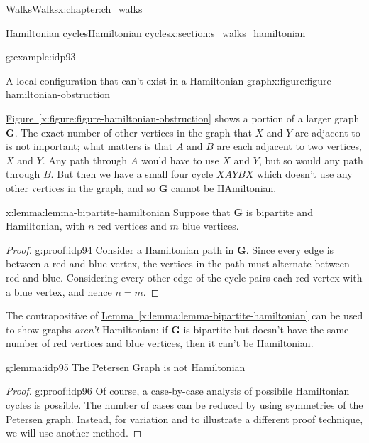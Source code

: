 \documentclass[oneside,10pt,]{book}
\newcommand{\xreffont}{\relax}
\numberwithin{equation}{section}
\newcommand{\bfG}{\mathbf{G}}
\begin{document}
\begin{chapterptx}{Walks}{}{Walks}{}{}{x:chapter:ch_walks}
\begin{sectionptx}{Hamiltonian cycles}{}{Hamiltonian cycles}{}{}{x:section:s_walks_hamiltonian}
\begin{example}{}{g:example:idp93}
\begin{figureptx}{A local configuration that can't exist in a Hamiltonian graph}{x:figure:figure-hamiltonian-obstruction}{}
\begin{image}{0.15}{0.7}{0.15}
{
}%
\end{image}%
\tcblower
\end{figureptx}%
\hyperref[x:figure:figure-hamiltonian-obstruction]{Figure~{\xreffont\ref{x:figure:figure-hamiltonian-obstruction}}} shows a portion of a larger graph \(\bfG\).  The exact number of other vertices in the graph that \(X\) and \(Y\) are adjacent to is not important; what matters is that \(A\) and \(B\) are each adjacent to two vertices, \(X\) and \(Y\).  Any path through \(A\) would have to use \(X\) and \(Y\), but so would any path through \(B\).  But then we have a small four cycle \(XAYBX\) which doesn't use any other vertices in the graph, and so \(\bfG\) cannot be HAmiltonian.%
\end{example}
\begin{lemma}{}{}{x:lemma:lemma-bipartite-hamiltonian}%
Suppose that \(\bfG\) is bipartite and Hamiltonian, with \(n\) red vertices and \(m\) blue vertices.%
\end{lemma}
\begin{proof}{}{g:proof:idp94}
Consider a Hamiltonian path in \(\bfG\).  Since every edge is between a red and blue vertex, the vertices in the path must alternate between red and blue.  Considering every other edge of the cycle pairs each red vertex with a blue vertex, and hence \(n=m\).%
\end{proof}
The contrapositive of \hyperref[x:lemma:lemma-bipartite-hamiltonian]{Lemma~{\xreffont\ref{x:lemma:lemma-bipartite-hamiltonian}}} can be used to show graphs \emph{aren't} Hamiltonian: if \(\bfG\) is bipartite but doesn't have the same number of red vertices and blue vertices, then it can't be Hamiltonian.%
\begin{lemma}{}{}{g:lemma:idp95}%
The Petersen Graph is not Hamiltonian%
\end{lemma}
\begin{proof}{}{g:proof:idp96}
Of course, a case-by-case analysis of possibile Hamiltonian cycles is possible.  The number of cases can be reduced by using symmetries of the Petersen graph. Instead, for variation and to illustrate a different proof technique, we will use another method.%

\end{proof}
\end{sectionptx}
\end{chapterptx}
\end{document}

